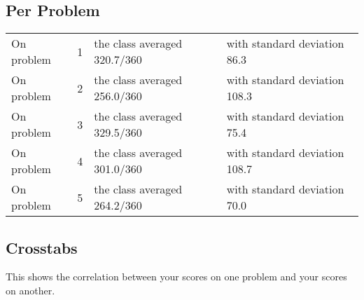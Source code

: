 \documentclass[11pt]{handout}
\begin{document}
\subsection*{Per Problem}

\begin{tabular}{l@{ }r@{ }l@{ }l}
On problem & 1 & the class averaged 320.7/360 & with standard deviation 86.3 \\
On problem & 2 & the class averaged 256.0/360 & with standard deviation 108.3 \\
On problem & 3 & the class averaged 329.5/360 & with standard deviation 75.4 \\
On problem & 4 & the class averaged 301.0/360 & with standard deviation 108.7 \\
On problem & 5 & the class averaged 264.2/360 & with standard deviation 70.0 \\
\end{tabular}

\subsection*{Crosstabs}


This shows the correlation between your scores on one problem and your scores on another.
\end{document}
